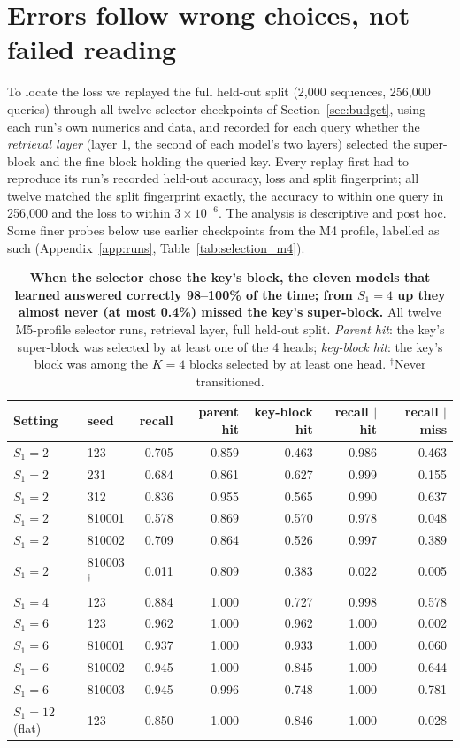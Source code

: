 \section{Errors follow wrong choices, not failed reading}
\label{sec:selection}

To locate the loss we replayed the full held-out split (2{,}000 sequences, 256{,}000 queries) through all twelve
selector checkpoints of Section~\ref{sec:budget}, using each run's own numerics and data, and recorded for each query
whether the \emph{retrieval layer} (layer 1, the second of each model's two layers) selected the super-block and the
fine block holding the queried key. Every replay first
had to reproduce its run's recorded held-out accuracy, loss and split fingerprint; all twelve matched the split
fingerprint exactly, the accuracy to within one query in 256{,}000 and the loss to within $3{\times}10^{-6}$. The
analysis is descriptive and post hoc. Some finer probes below use earlier checkpoints from the M4 profile, labelled
as such (Appendix~\ref{app:runs}, Table~\ref{tab:selection_m4}).

\begin{table}[t]
\centering
\scriptsize
\begin{tabular}{llrrrrr}
\toprule
Setting & seed & recall & parent hit & key-block hit & recall $\mid$ hit & recall $\mid$ miss \\
\midrule
$S_1{=}2$ & 123 & 0.705 & 0.859 & 0.463 & 0.986 & 0.463 \\
$S_1{=}2$ & 231 & 0.684 & 0.861 & 0.627 & 0.999 & 0.155 \\
$S_1{=}2$ & 312 & 0.836 & 0.955 & 0.565 & 0.990 & 0.637 \\
$S_1{=}2$ & 810001 & 0.578 & 0.869 & 0.570 & 0.978 & 0.048 \\
$S_1{=}2$ & 810002 & 0.709 & 0.864 & 0.526 & 0.997 & 0.389 \\
$S_1{=}2$ & 810003$^\dagger$ & 0.011 & 0.809 & 0.383 & 0.022 & 0.005 \\
$S_1{=}4$ & 123 & 0.884 & 1.000 & 0.727 & 0.998 & 0.578 \\
$S_1{=}6$ & 123 & 0.962 & 1.000 & 0.962 & 1.000 & 0.002 \\
$S_1{=}6$ & 810001 & 0.937 & 1.000 & 0.933 & 1.000 & 0.060 \\
$S_1{=}6$ & 810002 & 0.945 & 1.000 & 0.845 & 1.000 & 0.644 \\
$S_1{=}6$ & 810003 & 0.945 & 0.996 & 0.748 & 1.000 & 0.781 \\
$S_1{=}12$ (flat) & 123 & 0.850 & 1.000 & 0.846 & 1.000 & 0.028 \\
\bottomrule
\end{tabular}
\caption{\textbf{When the selector chose the key's block, the eleven models that learned answered correctly 98--100\%
of the time; from $S_1{=}4$ up they almost never (at most 0.4\%) missed the key's super-block.} All twelve M5-profile selector runs, retrieval layer, full held-out split.
\emph{Parent hit}: the key's super-block was selected by at least one of the 4 heads; \emph{key-block hit}: the key's
block was among the $K{=}4$ blocks selected by at least one head. $^\dagger$Never transitioned.}
\label{tab:selection}
\end{table}

